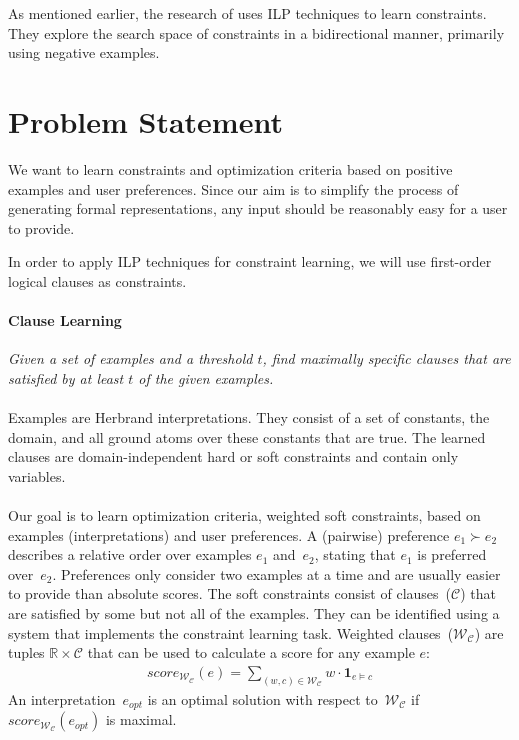 \documentclass[letterpaper]{article}
\newcommand{\sym}[1]{\ensuremath{\mathcal{#1}}}
\theoremstyle{definition}
\begin{document}
As mentioned earlier, the research of \cite{Lallouet:LearningCP} uses ILP techniques to learn constraints.
They explore the search space of constraints in a bidirectional manner, primarily using negative examples.


\section{Problem Statement}
\label{sec:problem}
We want to learn constraints and optimization criteria based on positive examples and user preferences.
Since our aim is to simplify the process of generating formal representations, any input should be reasonably easy for a user to provide.

In order to apply ILP techniques for constraint learning, we will use first-order logical clauses as constraints.

\paragraph*{Clause Learning}
\emph{Given a set of examples and a threshold $t$, find maximally specific clauses that are satisfied by at least $t$ of the given examples.}
\\\\
Examples are Herbrand interpretations.
They consist of a set of constants, the domain, and all ground atoms over these constants that are true.
The learned clauses are domain-independent hard or soft constraints and contain only variables.
\\\\
Our goal is to learn optimization criteria, weighted soft constraints, based on examples (interpretations) and user preferences.
A (pairwise) preference $e_1 \succ e_2$ describes a relative order over examples $e_1$ and~$e_2$, stating that $e_1$ is preferred over~$e_2$.
Preferences only consider two examples at a time and are usually easier to provide than absolute scores.
The soft constraints consist of clauses~(\sym{C}) that are satisfied by some but not all of the examples.
They can be identified using a system that implements the constraint learning task.
Weighted clauses~($\sym{W}_{\sym{C}}$) are tuples $\mathbb{R} \times \sym{C}$ that can be used to calculate a score for any example $e$:
\begin{eqnarray}
  \label{eqn:score}
  score_{\sym{W}_{\sym{C}}}(e) = \sum\limits_{(\mathit{w}, \mathit{c}) \in \sym{W}_{\sym{C}}} \mathit{w} \cdot \mathbf{1}_{e \models c}
\end{eqnarray}
An interpretation~$e_{opt}$ is an optimal solution with respect to~$\sym{W}_{\sym{C}}$ if $score_{\sym{W}_{\sym{C}}}(e_{opt})$ is maximal.
\end{document}
